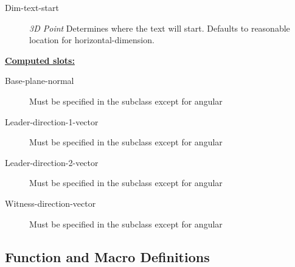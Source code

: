 \documentclass [11pt]{book}
\begin{document}
\begin{itemize}
\begin{description}

\item [Dim-text-start]
\emph{3D Point} Determines where the text will start. Defaults to reasonable location for
horizontal-dimension.


\end{description}






\textbf{
\underline{Computed slots:}}

\begin{description}

\item [Base-plane-normal]
Must be specified in the subclass except for angular


\item [Leader-direction-1-vector]
Must be specified in the subclass except for angular


\item [Leader-direction-2-vector]
Must be specified in the subclass except for angular


\item [Witness-direction-vector]
Must be specified in the subclass except for angular


\end{description}







\end{itemize}



\subsection{Function and Macro Definitions}

\label{subsec:functionandmacrodefinitions}
\end{document}
